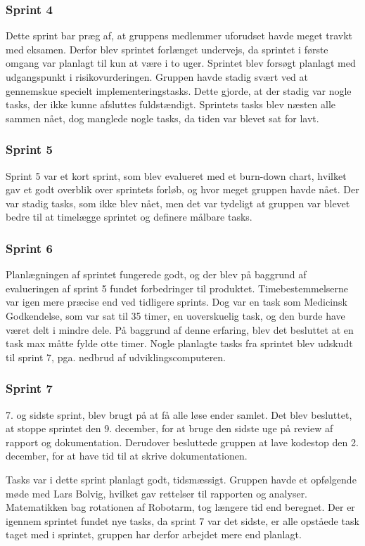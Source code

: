 \subsubsection{Sprint 4} 
Dette sprint bar præg af, at gruppens medlemmer uforudset havde meget travkt med eksamen. Derfor blev sprintet forlænget undervejs, da sprintet i første omgang var planlagt til kun at være i to uger. Sprintet blev forsøgt planlagt med udgangspunkt i risikovurderingen. Gruppen havde stadig svært ved at gennemskue specielt implementeringstasks. Dette gjorde, at der stadig var nogle tasks, der ikke kunne afsluttes fuldstændigt. Sprintets tasks blev næsten alle sammen nået, dog manglede nogle tasks, da tiden var blevet sat for lavt. 

\subsubsection{Sprint 5} 
Sprint 5 var et kort sprint, som blev evalueret med et burn-down chart, hvilket gav et godt overblik over sprintets forløb, og hvor meget gruppen havde nået. Der var stadig tasks, som ikke blev nået, men det var tydeligt at gruppen var blevet bedre til at timelægge sprintet og definere målbare tasks.

\subsubsection{Sprint 6} 
Planlægningen af sprintet fungerede godt, og der blev på baggrund af evalueringen af sprint 5 fundet forbedringer til produktet. Timebestemmelserne var igen mere præcise end ved tidligere sprints. Dog var en task som Medicinsk Godkendelse, som var sat til 35 timer, en uoverskuelig task, og den burde have været delt i mindre dele. På baggrund af denne erfaring, blev det besluttet at en task max måtte fylde otte timer. Nogle planlagte tasks fra sprintet blev udskudt til sprint 7, pga. nedbrud af udviklingscomputeren.   

\subsubsection{Sprint 7} 
7. og sidste sprint, blev brugt på at få alle løse ender samlet. Det blev besluttet, at stoppe sprintet den 9. december, for at bruge den sidste uge på review af rapport og dokumentation. Derudover besluttede gruppen at lave kodestop den 2. december, for at have tid til at skrive dokumentationen. 

Tasks var i dette sprint planlagt godt, tidsmæssigt. Gruppen havde et opfølgende møde med Lars Bolvig, hvilket gav rettelser til rapporten og analyser. Matematikken bag rotationen af Robotarm, tog længere tid end beregnet. Der er igennem sprintet fundet nye tasks, da sprint 7 var det sidste, er alle opståede task taget med i sprintet, gruppen har derfor arbejdet mere end planlagt. 
 
